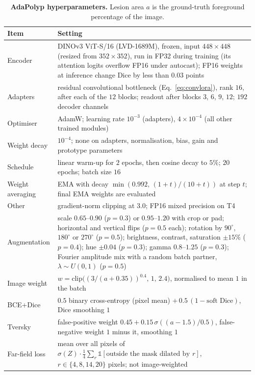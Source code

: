 \documentclass{ieeeaccess}
\begin{document}
\begin{table}[!t]
  \centering
  \caption{\textbf{AdaPolyp hyperparameters.} Lesion area $a$ is the ground-truth foreground percentage of the image.}
  \label{tab:impl}
  \footnotesize
  \setlength{\tabcolsep}{4pt}
  \begin{tabular}{@{}l p{}@{}}
    \toprule
    \textbf{Item} & \textbf{Setting} \\
    \midrule
    Encoder & DINOv3 ViT-S/16 (LVD-1689M), frozen, input $448\times448$ (resized from $352\times352$), run in FP32 during training (its attention logits overflow FP16 under autocast); FP16 weights at inference change Dice by less than $0.03$ points \\
    Adapters & residual convolutional bottleneck (Eq.~\eqref{eq:convlora}), rank $16$, after each of the $12$ blocks; readout after blocks $3$, $6$, $9$, $12$; $192$ decoder channels \\
    Optimiser & AdamW; learning rate $10^{-3}$ (adapters), $4\times10^{-4}$ (all other trained modules) \\
    Weight decay & $10^{-4}$; none on adapters, normalisation, bias, gain and prototype parameters \\
    Schedule & linear warm-up for $2$ epochs, then cosine decay to $5\%$; $20$ epochs; batch size $16$ \\
    Weight averaging & EMA with decay $\min(0.992,\,(1+t)/(10+t))$ at step $t$; final EMA weights are evaluated \\
    Other & gradient-norm clipping at $3.0$; FP16 mixed precision on T4 \\
    Augmentation & scale $0.65$--$0.90$ ($p=0.3$) or $0.95$--$1.20$ with crop or pad; horizontal and vertical flips ($p=0.5$ each); rotation by $90^\circ$, $180^\circ$ or $270^\circ$ ($p=0.5$); brightness, contrast, saturation $\pm15\%$ ($p=0.4$); hue $\pm0.04$ ($p=0.3$); gamma $0.8$--$1.25$ ($p=0.3$); Fourier amplitude mix with a random batch partner, $\lambda\sim U(0,1)$ ($p=0.5$) \\
    \midrule
    Image weight & $w=\mathrm{clip}\bigl((3/(a+0.35))^{0.4},\,1,\,2.4\bigr)$, normalised to mean $1$ in the batch \\
    BCE+Dice & $0.5$ binary cross-entropy (pixel mean) $+\,0.5\,(1-\text{soft Dice})$, Dice smoothing $1$ \\
    Tversky & false-positive weight $0.45+0.15\,\sigma((a-1.5)/0.5)$, false-negative weight $1$ minus it, smoothing $1$ \\
    Far-field loss & mean over all pixels of $\sigma(Z)\cdot\tfrac14\sum_{r}\mathbb{1}[\text{outside the mask dilated by } r]$, $r\in\{4,8,14,20\}$ pixels; not image-weighted \\

\end{tabular}
\end{table}
\end{document}
